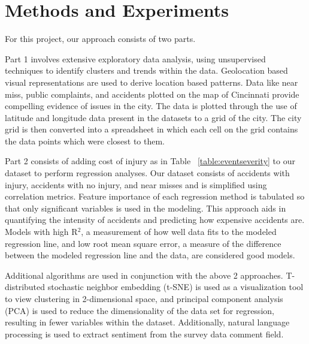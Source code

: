 \documentclass{llncs}
\begin{document}
\section{Methods and Experiments}

For this project, our approach consists of two parts.

Part 1 involves extensive exploratory data analysis, using unsupervised techniques to identify clusters and trends within the data. Geolocation based visual representations are used to derive location based patterns. Data like near miss, public complaints, and accidents plotted on the map of Cincinnati provide compelling evidence of issues in the city. The data is plotted through the use of latitude and longitude data present in the datasets to a grid of the city. The city grid is then converted into a spreadsheet in which each cell on the grid contains the data points which were closest to them.

Part 2 consists of adding cost of injury as in Table ~\ref{table:eventseverity} to our dataset to perform regression analyses. Our dataset consists of accidents with injury, accidents with no injury, and near misses and is simplified using correlation metrics. Feature importance  of each regression method is tabulated so that only significant variables is used in the modeling. This approach aids in quantifying the intensity of accidents and predicting how expensive accidents are. Models with high R$^{2}$, a measurement of how well data fits to the modeled regression line, and low root mean square error, a measure of the difference between the modeled regression line and the data, are considered good models.

Additional algorithms are used in conjunction with the above 2 approaches. T-distributed stochastic neighbor embedding (t-SNE) is used as a visualization tool to view clustering in 2-dimensional space, and principal component analysis (PCA) is used to reduce the dimensionality of the data set for regression, resulting in fewer variables within the dataset. Additionally, natural language processing is used to extract sentiment from the survey data comment field.
\end{document}
